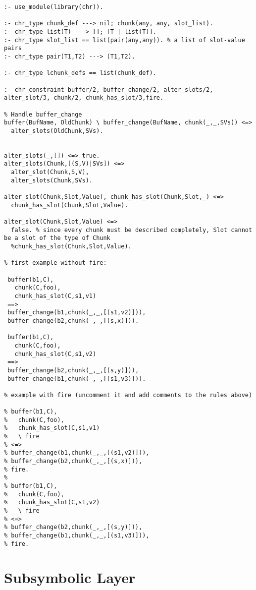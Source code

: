\begin{lstlisting}[caption={Rule order example}]
:- use_module(library(chr)).

:- chr_type chunk_def ---> nil; chunk(any, any, slot_list).
:- chr_type list(T) ---> []; [T | list(T)].
:- chr_type slot_list == list(pair(any,any)). % a list of slot-value pairs
:- chr_type pair(T1,T2) ---> (T1,T2).

:- chr_type lchunk_defs == list(chunk_def).

:- chr_constraint buffer/2, buffer_change/2, alter_slots/2, alter_slot/3, chunk/2, chunk_has_slot/3,fire.

% Handle buffer_change
buffer(BufName, OldChunk) \ buffer_change(BufName, chunk(_,_,SVs)) <=>
  alter_slots(OldChunk,SVs).

  
alter_slots(_,[]) <=> true.
alter_slots(Chunk,[(S,V)|SVs]) <=> 
  alter_slot(Chunk,S,V),
  alter_slots(Chunk,SVs).
  
alter_slot(Chunk,Slot,Value), chunk_has_slot(Chunk,Slot,_) <=>
  chunk_has_slot(Chunk,Slot,Value).
  
alter_slot(Chunk,Slot,Value) <=>
  false. % since every chunk must be described completely, Slot cannot be a slot of the type of Chunk
  %chunk_has_slot(Chunk,Slot,Value).  

% first example without fire: 
  
 buffer(b1,C),
   chunk(C,foo),
   chunk_has_slot(C,s1,v1)
 ==>
 buffer_change(b1,chunk(_,_,[(s1,v2)])),
 buffer_change(b2,chunk(_,_,[(s,x)])).
 
 buffer(b1,C),
   chunk(C,foo),
   chunk_has_slot(C,s1,v2)
 ==>
 buffer_change(b2,chunk(_,_,[(s,y)])),
 buffer_change(b1,chunk(_,_,[(s1,v3)])).

% example with fire (uncomment it and add comments to the rules above) 
 
% buffer(b1,C),
%   chunk(C,foo),
%   chunk_has_slot(C,s1,v1)
%   \ fire
% <=>
% buffer_change(b1,chunk(_,_,[(s1,v2)])),
% buffer_change(b2,chunk(_,_,[(s,x)])),
% fire.
% 
% buffer(b1,C),
%   chunk(C,foo),
%   chunk_has_slot(C,s1,v2)
%   \ fire
% <=>
% buffer_change(b2,chunk(_,_,[(s,y)])),
% buffer_change(b1,chunk(_,_,[(s1,v3)])),
% fire.
\end{lstlisting}

\section{Subsymbolic Layer}
\label{app:ex:subsymbolic_layer}

